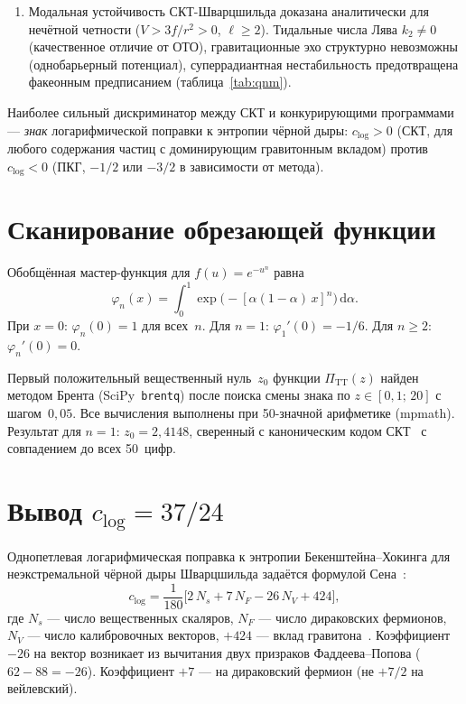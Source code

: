 \documentclass[12pt,a4paper]{article}
\theoremstyle{plain}
\theoremstyle{definition}
\theoremstyle{remark}
\newcommand{\dd}{\mathrm{d}}
\begin{document}
{{{{{{\begin{enumerate}[(1)]
\item Модальная устойчивость СКТ-Шварцшильда доказана
  аналитически для нечётной четности ($V > 3f/r^2 > 0$,
  $\ell \geq 2$). Тидальные числа Лява $k_2 \neq 0$
  (качественное отличие от ОТО), гравитационные эхо структурно
  невозможны (однобарьерный потенциал), суперрадиантная
  нестабильность предотвращена факеонным предписанием
  (таблица~\ref{tab:qnm}).
\end{enumerate}

Наиболее сильный дискриминатор между СКТ и конкурирующими
программами --- \emph{знак} логарифмической поправки к энтропии
чёрной дыры: $c_{\log} > 0$ (СКТ, для любого содержания частиц
с доминирующим гравитонным вкладом) против $c_{\log} < 0$
(ПКГ, $-1/2$ или $-3/2$ в зависимости от метода).

\appendix
\section{Сканирование обрезающей функции}
\label{app:cutoff}

Обобщённая мастер-функция для $f(u) = e^{-u^n}$ равна
\begin{equation}\label{eq:phi-n-app}
  \varphi_n(x) = \int_0^1
  \exp\bigl(-[\alpha(1-\alpha)\, x]^n\bigr)\, \dd\alpha.
\end{equation}
При $x = 0$: $\varphi_n(0) = 1$ для всех~$n$. Для $n = 1$:
$\varphi_1'(0) = -1/6$. Для $n \geq 2$: $\varphi_n'(0) = 0$.

Первый положительный вещественный нуль~$z_0$ функции
$\Pi_{\mathrm{TT}}(z)$ найден методом Брента
(SciPy~\texttt{brentq}) после поиска смены знака по
$z \in [0{,}1;\, 20]$ с шагом~$0{,}05$. Все вычисления
выполнены при 50-значной арифметике (mpmath). Результат для $n = 1$:
$z_0 = 2{,}4148$, сверенный с каноническим кодом
СКТ~\cite{Alfyorov:2026repo} с совпадением до всех 50~цифр.

\section{Вывод $c_{\log} = 37/24$}
\label{app:clog}

Однопетлевая логарифмическая поправка к энтропии
Бекенштейна--Хокинга для неэкстремальной чёрной дыры
Шварцшильда задаётся формулой Сена~\cite{Sen:2012}:
\begin{equation}\label{eq:sen-formula}
  c_{\log} = \frac{1}{180}\bigl[
  2\,N_s + 7\,N_F - 26\,N_V + 424\bigr],
\end{equation}
где $N_s$ --- число вещественных скаляров, $N_F$ --- число
дираковских фермионов, $N_V$ --- число калибровочных векторов,
$+424$ --- вклад гравитона~\cite{Sen:2012}.
Коэффициент $-26$ на вектор возникает из вычитания двух
призраков Фаддеева--Попова ($62 - 88 = -26$). Коэффициент
$+7$ --- на дираковский фермион (не $+7/2$ на вейлевский).

}}}}}}
\end{document}
